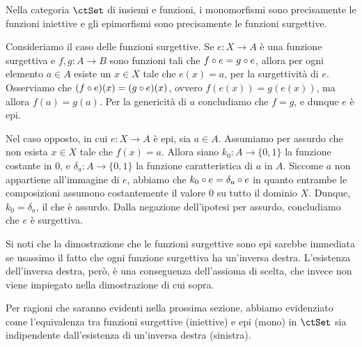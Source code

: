 \begin{example}\label{monoepi_in_set}
	Nella categoria \(\ctSet\) di insiemi e funzioni, i monomorfismi sono precisamente le funzioni iniettive	e gli epimorfismi sono precisamente le funzioni surgettive.

	Consideriamo il caso delle funzioni surgettive.	Se \(e \colon X \to A\) è una funzione surgettiva e \(f, g \colon A \to B\) sono funzioni tali che \(f \circ e = g \circ e\),	allora per ogni elemento \(a \in A\) esiste un \(x \in X\) tale che \(e(x) = a\), per la surgettività di \(e\).	Osserviamo che \((f \circ e)(x) = (g \circ e)(x)\), ovvero \(f(e(x)) = g(e(x))\),	ma allora \(f(a) = g(a)\).	Per la genericità di \(a\) concludiamo che \(f = g\), e dunque \(e\) è epi.

	Nel caso opposto, in cui \(e \colon X \to A\) è epi, sia \(a \in A\).
	Assumiamo per assurdo che non esista \(x \in X\) tale che \(f(x) = a\).
	Allora siano \(k_0 \colon A \to \{0, 1\}\) la funzione costante in \(0\),
	e \(\delta_a \colon A \to \{0, 1\}\) la funzione caratteristica di \(a\) in \(A\).
	Siccome \(a\) non appartiene all'immagine di \(e\), abbiamo che \(k_0 \circ e = \delta_a \circ e\)
	in quanto entrambe le composizioni assumono costantemente il valore \(0\) su tutto il dominio \(X\).
	Dunque, \(k_0 = \delta_a\), il che è assurdo.
	Dalla negazione dell'ipotesi per assurdo, concludiamo che \(e\) è surgettiva.
\end{example}

Si noti che la dimostrazione che le funzioni surgettive sono epi sarebbe immediata
se usassimo il fatto che ogni funzione surgettiva ha un'inversa destra.
L'esistenza dell'inversa destra, però, è una conseguenza dell'assioma di scelta,
che invece non viene impiegato nella dimostrazione di cui sopra.

Per ragioni che saranno evidenti nella prossima sezione,
abbiamo evidenziato come l'equivalenza tra funzioni surgettive (iniettive)
e epi (mono) in \(\ctSet\) sia indipendente dall'esistenza di un'inversa destra (sinistra).

